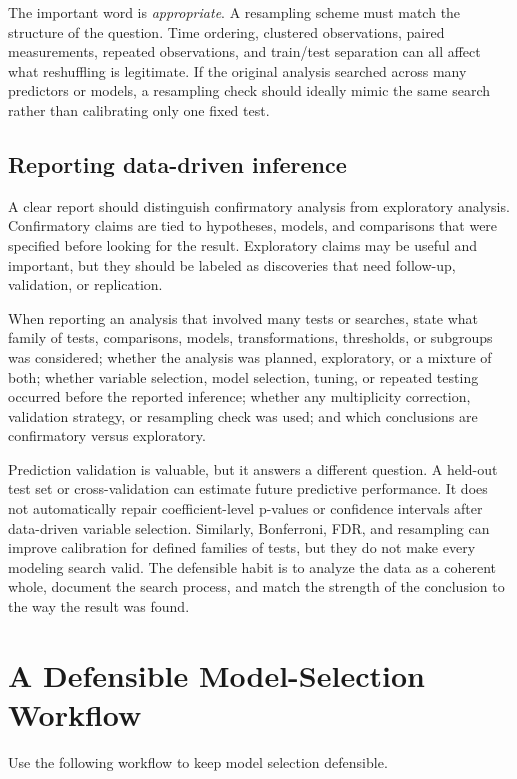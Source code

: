 The important word is \emph{appropriate}.  A resampling scheme must match the structure of the question.  Time ordering, clustered observations, paired measurements, repeated observations, and train/test separation can all affect what reshuffling is legitimate.  If the original analysis searched across many predictors or models, a resampling check should ideally mimic the same search rather than calibrating only one fixed test.

\subsection*{Reporting data-driven inference}

A clear report should distinguish confirmatory analysis from exploratory analysis.  Confirmatory claims are tied to hypotheses, models, and comparisons that were specified before looking for the result.  Exploratory claims may be useful and important, but they should be labeled as discoveries that need follow-up, validation, or replication.

When reporting an analysis that involved many tests or searches, state what family of tests, comparisons, models, transformations, thresholds, or subgroups was considered; whether the analysis was planned, exploratory, or a mixture of both; whether variable selection, model selection, tuning, or repeated testing occurred before the reported inference; whether any multiplicity correction, validation strategy, or resampling check was used; and which conclusions are confirmatory versus exploratory.

Prediction validation is valuable, but it answers a different question.  A held-out test set or cross-validation can estimate future predictive performance.  It does not automatically repair coefficient-level p-values or confidence intervals after data-driven variable selection.  Similarly, Bonferroni, FDR, and resampling can improve calibration for defined families of tests, but they do not make every modeling search valid.  The defensible habit is to analyze the data as a coherent whole, document the search process, and match the strength of the conclusion to the way the result was found.

\section{A Defensible Model-Selection Workflow}

Use the following workflow to keep model selection defensible.

